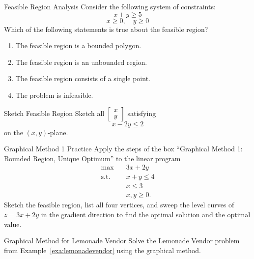 \begin{ex}{Feasible Region Analysis}{}
Consider the following system of constraints:
\[
x + y \geq 5
\]
\[
x \geq 0, \quad y \geq 0
\]
Which of the following statements is true about the feasible region?
\begin{enumerate}
    \item  The feasible region is a bounded polygon.
    \item The feasible region is an unbounded region.
    \item The feasible region consists of a single point.
    \item The problem is infeasible.
\end{enumerate}
\exrefs{\S\ref{sec:nonempty-bounded}, \S\ref{sec:unbounded-regions}}
\end{ex}

\begin{ex}{Sketch Feasible Region}{}\label{ex:feasible-region}
Sketch all \(\begin{bmatrix} x \\ y \end{bmatrix}\) satisfying
\[
x - 2y \leq 2
\]
on the \((x,y)\)-plane.
\exrefs{\S\ref{sec:nonempty-bounded}}
\end{ex}

\begin{ex}{Graphical Method 1 Practice}{}\label{ex:graphical-method-one}
Apply the steps of the box ``Graphical Method 1: Bounded Region, Unique Optimum'' to the linear program
\begin{align*}
\max \quad & 3x + 2y\\
\text{s.t.} \quad & x + y \leq 4\\
& x \leq 3\\
& x, y \geq 0.
\end{align*}
Sketch the feasible region, list all four vertices, and sweep the level curves of $z = 3x + 2y$ in the gradient direction to find the optimal solution and the optimal value.
\end{ex}

\begin{ex}{Graphical Method for Lemonade Vendor}{}
Solve the Lemonade Vendor problem from Example~\ref{exa:lemonadevendor} using the graphical method.
\end{ex}


